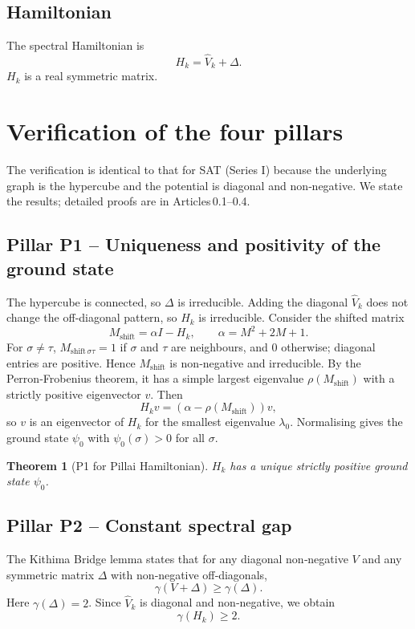 \documentclass[11pt,a4paper]{article}
\newtheorem{theorem}{Theorem}[section]
\begin{document}
\subsection{Hamiltonian}
The spectral Hamiltonian is
\[
H_k = \hat{V}_k + \Delta.
\]
$H_k$ is a real symmetric matrix.

\section{Verification of the four pillars}

The verification is identical to that for SAT (Series I) because the underlying graph is the hypercube and the potential is diagonal and non‑negative. We state the results; detailed proofs are in Articles 0.1–0.4.

\subsection{Pillar P1 – Uniqueness and positivity of the ground state}
The hypercube is connected, so $\Delta$ is irreducible. Adding the diagonal $\hat{V}_k$ does not change the off‑diagonal pattern, so $H_k$ is irreducible. Consider the shifted matrix
\[
M_{\text{shift}} = \alpha I - H_k,\qquad \alpha = M^2 + 2M + 1.
\]
For $\sigma\neq\tau$, $M_{\text{shift}\,\sigma\tau} = 1$ if $\sigma$ and $\tau$ are neighbours, and $0$ otherwise; diagonal entries are positive. Hence $M_{\text{shift}}$ is non‑negative and irreducible. By the Perron‑Frobenius theorem, it has a simple largest eigenvalue $\rho(M_{\text{shift}})$ with a strictly positive eigenvector $v$. Then
\[
H_k v = (\alpha - \rho(M_{\text{shift}})) v,
\]
so $v$ is an eigenvector of $H_k$ for the smallest eigenvalue $\lambda_0$. Normalising gives the ground state $\psi_0$ with $\psi_0(\sigma) > 0$ for all $\sigma$.

\begin{theorem}[P1 for Pillai Hamiltonian]
$H_k$ has a unique strictly positive ground state $\psi_0$.
\end{theorem}

\subsection{Pillar P2 – Constant spectral gap}
The Kithima Bridge lemma states that for any diagonal non‑negative $V$ and any symmetric matrix $\Delta$ with non‑negative off‑diagonals,
\[
\gamma(V + \Delta) \ge \gamma(\Delta).
\]
Here $\gamma(\Delta) = 2$. Since $\hat{V}_k$ is diagonal and non‑negative, we obtain
\[
\gamma(H_k) \ge 2.
\]
\end{document}
